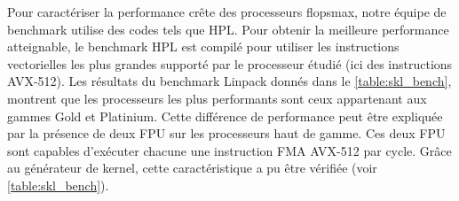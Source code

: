         
        \begin{table}[h!]
        \centering
        \caption{Principales différences entre les gammes de processeurs Intel de génération Skylake.}
        \label{table:skl}
        
        \end{table}
        
      
      Pour caractériser la performance crête des processeurs \gls{flopsmax}, notre équipe de benchmark utilise des codes tels que HPL. Pour obtenir la meilleure performance atteignable, le benchmark HPL est compilé pour utiliser les instructions vectorielles les plus grandes supporté par le processeur étudié (ici des instructions AVX-512). Les résultats du benchmark Linpack donnés dans le \autoref{table:skl_bench}, montrent que les processeurs les plus performants sont ceux appartenant aux gammes Gold et Platinium. Cette différence de performance peut être expliquée par la présence de deux \gls{FPU} sur les processeurs haut de gamme. Ces deux FPU sont capables d'exécuter chacune une instruction \gls{FMA} AVX-512 par cycle. Grâce au générateur de kernel, cette caractéristique a pu être vérifiée (voir \autoref{table:skl_bench}). 

